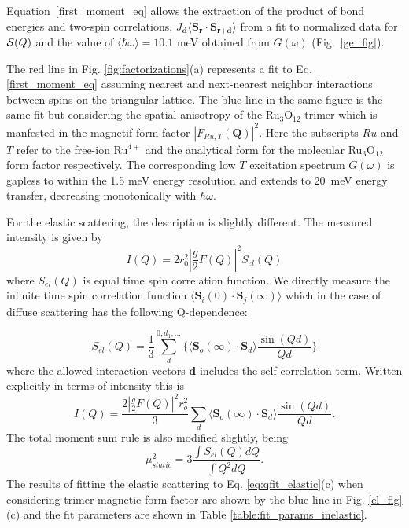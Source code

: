 \documentclass[%
 reprint,
superscriptaddress,
 amsmath,amssymb,
 aps,
 prb,
]{revtex4-2}
\begin{document}
Equation~\ref{first_moment_eq} allows the extraction of the product of bond energies and two-spin correlations, $J_\textbf{d}
\langle \textbf{S}_\textbf{r}\cdot\textbf{S}_{\textbf{r}+\textbf{d}}\rangle$ from a fit to normalized data for ${\cal S}(Q)$ and the value of $\langle\hbar\omega\rangle=10.1$ meV obtained from $G(\omega)$ (Fig.~\ref{ge_fig}). 

The red line in Fig. \ref{fig:factorizations}(a) represents a fit to Eq. \ref{first_moment_eq} assuming nearest and next-nearest neighbor interactions between spins on the triangular lattice. The blue line in the same figure is the same fit but considering the spatial anisotropy of the Ru$_3$O$_{12}$ trimer which is manfested in the magnetif form factor $|F_{Ru,T}(\bm{Q})|^2$. Here the subscripts $Ru$ and $T$ refer to the free-ion Ru$^{4+}$ and the analytical form for the molecular Ru$_3$O$_{12}$ form factor respectively. The corresponding low $T$ excitation spectrum $G(\omega)$ is gapless to within the 1.5 meV energy resolution and extends to 20~meV energy transfer, decreasing monotonically with $\hbar\omega$. 

For the elastic scattering, the description is slightly different. The measured intensity is given by 
\begin{equation}
    I(Q) = 2r_0^2|\frac{g}{2} F(Q)|^2 S_{el}(Q)
    \label{eq:intensity_elastic}
\end{equation}
where $S_{el}(Q)$ is equal time spin correlation function. We directly measure the infinite time spin correlation function $\langle \textbf{S}_i (0)\cdot \textbf{S}_j(\infty)\rangle$ which in the case of diffuse scattering has the following Q-dependence:

\begin{equation}
    S_{el}(Q)=\frac{1}{3}\sum_d^{0,d_1,...}\bigg\{\langle \textbf{S}_o(\infty)\cdot \textbf{S}_d \rangle \frac{\sin(Qd)}{Qd}\bigg\}
\end{equation}
where the allowed interaction vectors $\textbf{d}$ includes the self-correlation term. Written explicitly in terms of intensity this is
\begin{equation}
    I(Q) = \frac{2|\frac{g}{2}F(Q)|^2r_o^2}{3}\sum_d \langle \textbf{S}_o(\infty)\cdot \textbf{S}_d \rangle \frac{\sin(Qd)}{Qd}.
    \label{eq:qfit_elastic}
\end{equation}
The total moment sum rule is also modified slightly, being 
\begin{equation}
    \mu_{static}^2 =3 \frac{\int S_{el}(Q)dQ}{\int Q^2 dQ}.
    \label{eq:sum_rule_elastic}
\end{equation}
The results of fitting the elastic scattering to Eq. \ref{eq:qfit_elastic}(c) when considering trimer magnetic form factor are shown by the blue line in Fig. \ref{el_fig}(c) and the fit parameters are shown in Table \ref{table:fit_params_inelastic}.
\end{document}
